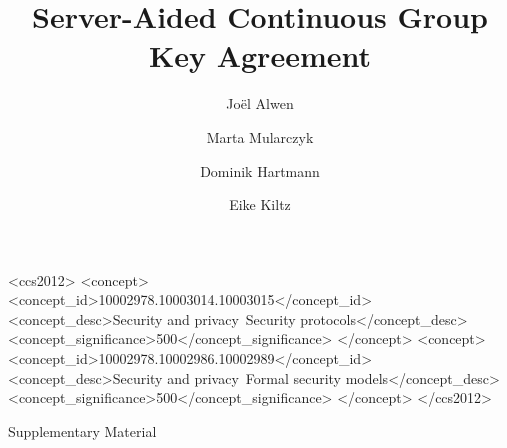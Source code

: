 \documentclass[sigconf]{acmart}
\begin{document}
\title{Server-Aided Continuous Group Key Agreement}

\author{Joël Alwen}
\author{Marta Mularczyk}
\author{Dominik Hartmann}
\author{Eike Kiltz}
\renewcommand{\shortauthors}{Alwen et al.}
\begin{abstract}

\end{abstract}

\begin{CCSXML}
<ccs2012>
   <concept>
       <concept_id>10002978.10003014.10003015</concept_id>
       <concept_desc>Security and privacy~Security protocols</concept_desc>
       <concept_significance>500</concept_significance>
       </concept>
   <concept>
       <concept_id>10002978.10002986.10002989</concept_id>
       <concept_desc>Security and privacy~Formal security models</concept_desc>
       <concept_significance>500</concept_significance>
       </concept>
 </ccs2012>
\end{CCSXML}



\maketitle




% 
% 






%




\clearpage
\newpage
\appendix

\begin{center}\Huge
	Supplementary Material
\end{center}





% 





\end{document}
